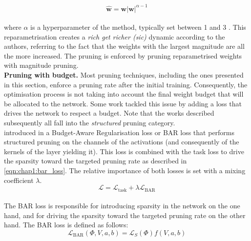 \begin{equation}
  \label{eqn:chap1:power_propagation}
  \mathbf{\hat{w}} = \mathbf{w} |\mathbf{w}|^{\alpha-1}
\end{equation}\\

\noindent where $\alpha$ is a hyperparameter of the method, typically set
between 1 and 3 \cite{powerprop}. This reparametrisation
creates a \emph{rich get richer (sic)} dynamic according to the authors,
referring to the fact that the weights with the largest magnitude are all the
more increased. The pruning is enforced by pruning reparametrised weights with
magnitude pruning.\\


\noindent \textbf{Pruning with budget.} Most pruning techniques, including the
ones presented in this section, enforce a pruning rate after the initial
training. Consequently, the optimisation process is not taking into account the
final weight budget that will be allocated to the network. Some work tackled
this issue by adding a loss that drives the network to respect a budget. Note
that the works described subsequently all fall into the \emph{structured}
pruning category.\\ 

\citeauthor{lemaire2019structured} introduced in \cite{lemaire2019structured} a
Budget-Aware Regularisation loss or BAR loss that performs structured pruning on
the channels of the activations (and consequently of the kernels of the layer
yielding it). This loss is combined with the task loss to drive the sparsity
toward the targeted pruning rate as described in \cref{eqn:chap1:bar_loss}. The
relative importance of both losses is set with a mixing coefficient $\lambda$.\\

\begin{equation}
  \label{eqn:chap1:bar_loss}
  \mathcal{L} = \mathcal{L}_{\text{task}} + \lambda \mathcal{L}_{\text{BAR}}
\end{equation}\\

\noindent The BAR loss is responsible for introducing sparsity in the network on the
one hand, and for driving the sparsity toward the targeted pruning rate on the
other hand. The BAR loss is defined as follows:\\ 

\begin{equation}
  \mathcal{L}_{\text{BAR}}(\Phi,V,a,b) = \mathcal{L}_S(\Phi)f(V,a,b)
\end{equation}\\

